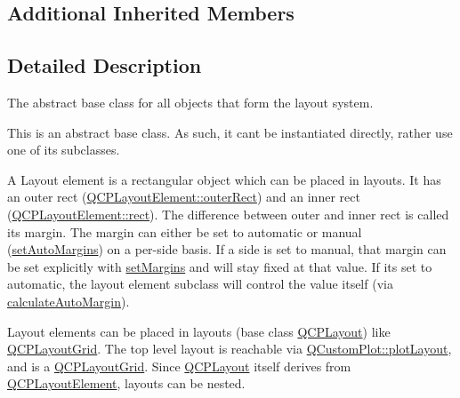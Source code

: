 \subsection*{Additional Inherited Members}


\subsection{Detailed Description}
The abstract base class for all objects that form the layout system. 

This is an abstract base class. As such, it can\textquotesingle{}t be instantiated directly, rather use one of its subclasses.

A Layout element is a rectangular object which can be placed in layouts. It has an outer rect (\mbox{\hyperlink{class_q_c_p_layout_element_a2a32a12a6161c9dffbadeb9cc585510c}{Q\+C\+P\+Layout\+Element\+::outer\+Rect}}) and an inner rect (\mbox{\hyperlink{class_q_c_p_layout_element_a208effccfe2cca4a0eaf9393e60f2dd4}{Q\+C\+P\+Layout\+Element\+::rect}}). The difference between outer and inner rect is called its margin. The margin can either be set to automatic or manual (\mbox{\hyperlink{class_q_c_p_layout_element_accfda49994e3e6d51ed14504abf9d27d}{set\+Auto\+Margins}}) on a per-\/side basis. If a side is set to manual, that margin can be set explicitly with \mbox{\hyperlink{class_q_c_p_layout_element_a8f450b1f3f992ad576fce2c63d8b79cf}{set\+Margins}} and will stay fixed at that value. If it\textquotesingle{}s set to automatic, the layout element subclass will control the value itself (via \mbox{\hyperlink{class_q_c_p_layout_element_a005c9f0fe84bc1591a2cf2c46fd477b4}{calculate\+Auto\+Margin}}).

Layout elements can be placed in layouts (base class \mbox{\hyperlink{class_q_c_p_layout}{Q\+C\+P\+Layout}}) like \mbox{\hyperlink{class_q_c_p_layout_grid}{Q\+C\+P\+Layout\+Grid}}. The top level layout is reachable via \mbox{\hyperlink{class_q_custom_plot_af1a1f1f571237deb7c2bd34a5e9f018f}{Q\+Custom\+Plot\+::plot\+Layout}}, and is a \mbox{\hyperlink{class_q_c_p_layout_grid}{Q\+C\+P\+Layout\+Grid}}. Since \mbox{\hyperlink{class_q_c_p_layout}{Q\+C\+P\+Layout}} itself derives from \mbox{\hyperlink{class_q_c_p_layout_element}{Q\+C\+P\+Layout\+Element}}, layouts can be nested.

